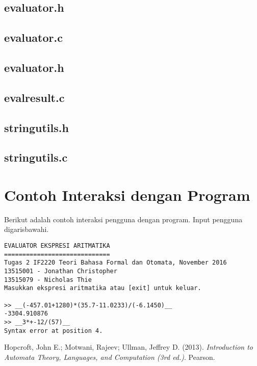 \documentclass[a4paper,titlepage]{article}
\begin{document}
		\subsection{evaluator.h}
			

		\subsection{evaluator.c}
			

		\subsection{evaluator.h}
			

		\subsection{evalresult.c}
			

		\subsection{stringutils.h}
			

		\subsection{stringutils.c}
			

	\section{Contoh Interaksi dengan Program}

		Berikut adalah contoh interaksi pengguna dengan program. Input pengguna digarisbawahi.

		\begin{lstlisting}
EVALUATOR EKSPRESI ARITMATIKA
=============================
Tugas 2 IF2220 Teori Bahasa Formal dan Otomata, November 2016
13515001 - Jonathan Christopher
13515079 - Nicholas Thie
Masukkan ekspresi aritmatika atau [exit] untuk keluar.

>> __(-457.01+1280)*(35.7-11.0233)/(-6.1450)__
-3304.910876
>> __3*+-12/(57)__
Syntax error at position 4.
		\end{lstlisting}

	\begin{thebibliography}{9}

		Hopcroft, John E.; Motwani, Rajeev; Ullman, Jeffrey D.
		(2013).
		\textit{Introduction to Automata Theory, Languages, and Computation (3rd ed.)}.
		Pearson.

	\end{thebibliography}
\end{document}
